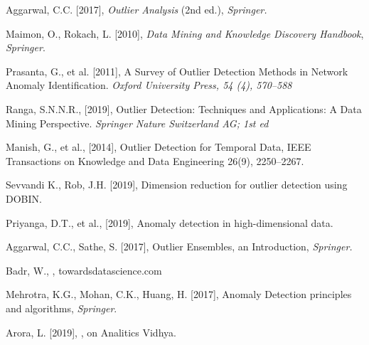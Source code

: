 \newpage {}
\begin{thebibliography}{99}

 Aggarwal, C.C. [2017],  \textit{Outlier Analysis} (2nd ed.), {\it Springer.} 

 Maimon, O.,  Rokach, L. [2010], \textit{Data Mining and Knowledge Discovery Handbook}, {\it Springer}. 

 Prasanta, G., et al. [2011], A Survey of Outlier Detection Methods in Network Anomaly Identification. {\it Oxford University Press, 54 (4), 570--588}

 Ranga, S.N.N.R., [2019], Outlier Detection: Techniques and Applications: A Data Mining Perspective. {\it Springer Nature Switzerland AG; 1st ed}

 Manish, G., et al., [2014], Outlier Detection for Temporal Data, IEEE Transactions on Knowledge and Data Engineering 26(9), 2250–2267.

 Sevvandi K., Rob, J.H. [2019], Dimension reduction for outlier detection using DOBIN.

 Priyanga, D.T., et al., [2019],  Anomaly detection in high-dimensional data.

 Aggarwal, C.C., Sathe, S. [2017], Outlier Ensembles, an Introduction, {\it Springer.}

 Badr, W., , towardsdatascience.com 

 Mehrotra, K.G., Mohan, C.K., Huang, H. [2017],  Anomaly Detection principles and algorithms, {\it Springer}. 

  Arora, L. [2019], , on Analitics Vidhya. 


\end{thebibliography}
